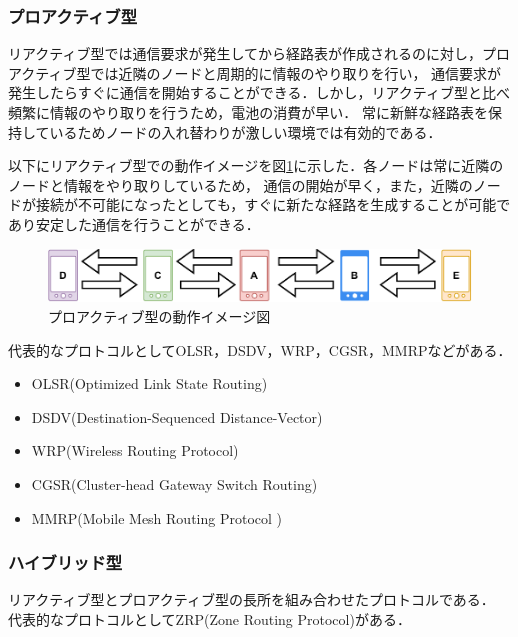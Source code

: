 \documentclass[a4paper, 11pt]{ltjsarticle}
\begin{document}
\clearpage
\subsubsection{プロアクティブ型}
リアクティブ型では通信要求が発生してから経路表が作成されるのに対し，プロアクティブ型では近隣のノードと周期的に情報のやり取りを行い，
通信要求が発生したらすぐに通信を開始することができる．しかし，リアクティブ型と比べ頻繁に情報のやり取りを行うため，電池の消費が早い．
常に新鮮な経路表を保持しているためノードの入れ替わりが激しい環境では有効的である．

以下にリアクティブ型での動作イメージを図\ref{proactive}に示した．各ノードは常に近隣のノードと情報をやり取りしているため，
通信の開始が早く，また，近隣のノードが接続が不可能になったとしても，すぐに新たな経路を生成することが可能であり安定した通信を行うことができる．
\begin{figure}[H]
  \centering
  \includegraphics[width=130mm]{proactive_model.pdf}
  \caption{プロアクティブ型の動作イメージ図}
  \label{proactive}
\end{figure}

代表的なプロトコルとしてOLSR，DSDV，WRP，CGSR，MMRPなどがある．

\begin{itemize}
  \item OLSR(Optimized Link State Routing)\cite{OLSR}\\

  \item DSDV(Destination-Sequenced Distance-Vector)\cite{DSDV}\\

  \item WRP(Wireless Routing Protocol)\cite{WRP}\\

  \item CGSR(Cluster-head Gateway Switch Routing)\cite{CGSR}\\

  \item MMRP(Mobile Mesh Routing Protocol )\cite{MMRP}\\
  
\end{itemize}

\subsubsection{ハイブリッド型}
リアクティブ型とプロアクティブ型の長所を組み合わせたプロトコルである．
代表的なプロトコルとしてZRP(Zone Routing Protocol)\cite{1574231874891177344}がある．
\end{document}
